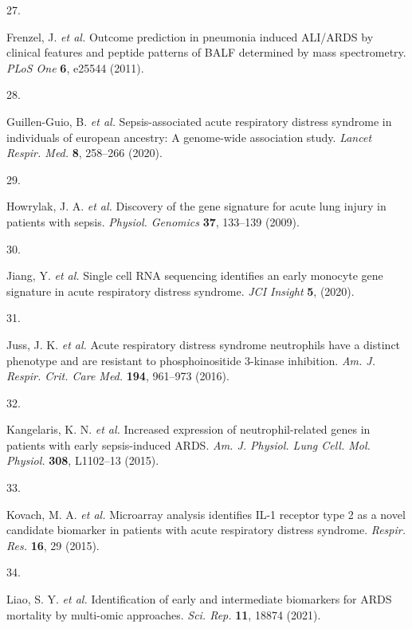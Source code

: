 \documentclass[
  11,
  a4paper,
]{article}
\newlength{\cslhangindent}
\newlength{\csllabelwidth}
\newlength{\cslentryspacingunit} %
\newenvironment{CSLReferences}[2] %
 {%
  \setlength{\parindent}{0pt}
  \ifodd #1
  \let\oldpar\par
  \def\par{\hangindent=\cslhangindent\oldpar}
  \fi
  \setlength{\parskip}{#2\cslentryspacingunit}
 }%
 {}
\newcommand{\CSLLeftMargin}[1]{\parbox[t]{\csllabelwidth}{#1}}
\newcommand{\CSLRightInline}[1]{\parbox[t]{\linewidth - \csllabelwidth}{#1}\break}
\begin{document}
\begin{CSLReferences}{0}{0}
\leavevmode{}%
\CSLLeftMargin{27. }%
\CSLRightInline{Frenzel, J. \emph{et al.} Outcome prediction in
pneumonia induced {ALI/ARDS} by clinical features and peptide patterns
of {BALF} determined by mass spectrometry. \emph{PLoS One} \textbf{6},
e25544 (2011).}

\leavevmode{}%
\CSLLeftMargin{28. }%
\CSLRightInline{Guillen-Guio, B. \emph{et al.} Sepsis-associated acute
respiratory distress syndrome in individuals of european ancestry: A
genome-wide association study. \emph{Lancet Respir. Med.} \textbf{8},
258--266 (2020).}

\leavevmode{}%
\CSLLeftMargin{29. }%
\CSLRightInline{Howrylak, J. A. \emph{et al.} Discovery of the gene
signature for acute lung injury in patients with sepsis. \emph{Physiol.
Genomics} \textbf{37}, 133--139 (2009).}

\leavevmode{}%
\CSLLeftMargin{30. }%
\CSLRightInline{Jiang, Y. \emph{et al.} Single cell {RNA} sequencing
identifies an early monocyte gene signature in acute respiratory
distress syndrome. \emph{JCI Insight} \textbf{5}, (2020).}

\leavevmode{}%
\CSLLeftMargin{31. }%
\CSLRightInline{Juss, J. K. \emph{et al.} Acute respiratory distress
syndrome neutrophils have a distinct phenotype and are resistant to
phosphoinositide 3-kinase inhibition. \emph{Am. J. Respir. Crit. Care
Med.} \textbf{194}, 961--973 (2016).}

\leavevmode{}%
\CSLLeftMargin{32. }%
\CSLRightInline{Kangelaris, K. N. \emph{et al.} Increased expression of
neutrophil-related genes in patients with early sepsis-induced {ARDS}.
\emph{Am. J. Physiol. Lung Cell. Mol. Physiol.} \textbf{308}, L1102--13
(2015).}

\leavevmode{}%
\CSLLeftMargin{33. }%
\CSLRightInline{Kovach, M. A. \emph{et al.} Microarray analysis
identifies {IL-1} receptor type 2 as a novel candidate biomarker in
patients with acute respiratory distress syndrome. \emph{Respir. Res.}
\textbf{16}, 29 (2015).}

\leavevmode{}%
\CSLLeftMargin{34. }%
\CSLRightInline{Liao, S. Y. \emph{et al.} Identification of early and
intermediate biomarkers for {ARDS} mortality by multi-omic approaches.
\emph{Sci. Rep.} \textbf{11}, 18874 (2021).}


\end{CSLReferences}
\end{document}
